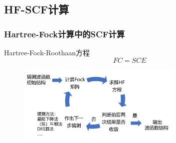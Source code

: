 \documentclass[10pt,aspectratio=43,mathserif,UTF8]{beamer}
\begin{document}
\subsection{HF-SCF计算}
\begin{frame}
\frametitle{Hartree-Fock计算中的SCF计算}
Hartree-Fock-Roothaan方程
\begin{equation}
	FC=SCE
\end{equation}

\begin{figure}[htbp]
	\centering
	\includegraphics[width=0.7\textwidth]{figure/HF/HF_process.pdf}
\end{figure}
\end{frame}

%



\end{document}
